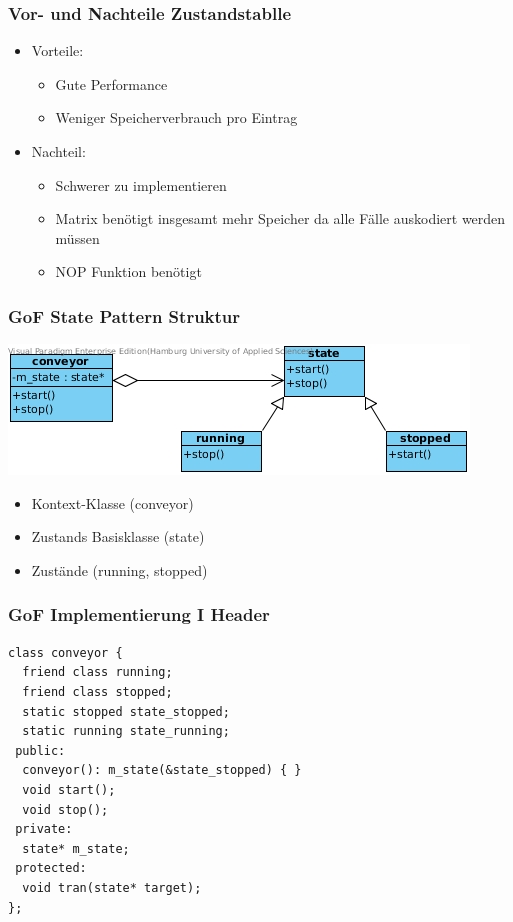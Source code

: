 \documentclass{beamer}
\begin{document}
\begin{frame}
 \frametitle{Vor- und Nachteile Zustandstablle}
 \begin{itemize}
  \item Vorteile:
  \begin{itemize}
   \item Gute Performance
   \item Weniger Speicherverbrauch pro Eintrag
  \end{itemize}
  \item Nachteil:
  \begin{itemize}
   \item Schwerer zu implementieren
   \item Matrix ben\"otigt insgesamt mehr Speicher da alle F\"alle auskodiert werden m\"ussen
   \item NOP Funktion ben\"otigt
  \end{itemize}
 \end{itemize}
\end{frame}

\begin{frame}
 \frametitle{GoF State Pattern Struktur}
 \includegraphics[scale=.6]{img/fsm_gof.jpg}
 \begin{itemize}
  \item Kontext-Klasse (conveyor)
  \item Zustands Basisklasse (state)
  \item Zust\"ande (running, stopped)
 \end{itemize}
\end{frame}

\begin{frame}[fragile]
 \frametitle{GoF Implementierung I Header}
 \begin{lstlisting}
class conveyor {
  friend class running;
  friend class stopped;
  static stopped state_stopped;
  static running state_running;
 public:
  conveyor(): m_state(&state_stopped) { }
  void start();
  void stop();
 private:
  state* m_state;
 protected:
  void tran(state* target);
};
 \end{lstlisting}
\end{frame}
\end{document}

